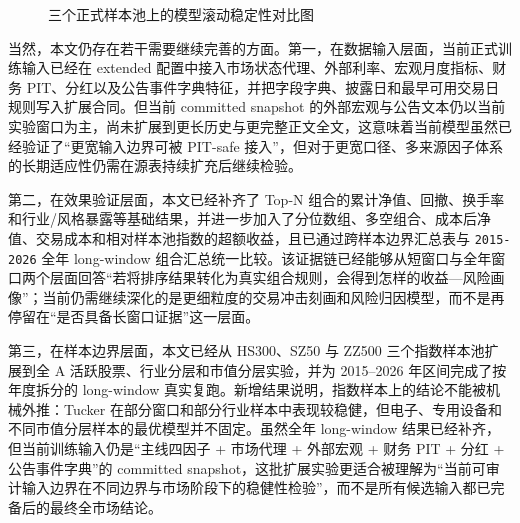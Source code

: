 \begin{figure}[htbp]
\centering
{}
\caption{三个正式样本池上的模型滚动稳定性对比图}
\label{fig:stability}
\end{figure}

当然，本文仍存在若干需要继续完善的方面。第一，在数据输入层面，当前正式训练输入已经在 extended 配置中接入市场状态代理、外部利率、宏观月度指标、财务 PIT、分红以及公告事件字典特征，并把字段字典、披露日和最早可用交易日规则写入扩展合同。但当前 committed snapshot 的外部宏观与公告文本仍以当前实验窗口为主，尚未扩展到更长历史与更完整正文全文，这意味着当前模型虽然已经验证了“更宽输入边界可被 PIT-safe 接入”，但对于更宽口径、多来源因子体系的长期适应性仍需在源表持续扩充后继续检验。

第二，在效果验证层面，本文已经补齐了 Top-N 组合的累计净值、回撤、换手率和行业/风格暴露等基础结果，并进一步加入了分位数组、多空组合、成本后净值、交易成本和相对样本池指数的超额收益，且已通过跨样本边界汇总表与 \texttt{2015-2026} 全年 long-window 组合汇总统一比较。该证据链已经能够从短窗口与全年窗口两个层面回答“若将排序结果转化为真实组合规则，会得到怎样的收益—风险画像”；当前仍需继续深化的是更细粒度的交易冲击刻画和风险归因模型，而不是再停留在“是否具备长窗口证据”这一层面。

第三，在样本边界层面，本文已经从 HS300、SZ50 与 ZZ500 三个指数样本池扩展到全 A 活跃股票、行业分层和市值分层实验，并为 2015--2026 年区间完成了按年度拆分的 long-window 真实复跑。新增结果说明，指数样本上的结论不能被机械外推：Tucker 在部分窗口和部分行业样本中表现较稳健，但电子、专用设备和不同市值分层样本的最优模型并不固定。虽然全年 long-window 结果已经补齐，但当前训练输入仍是“主线四因子 + 市场代理 + 外部宏观 + 财务 PIT + 分红 + 公告事件字典”的 committed snapshot，这批扩展实验更适合被理解为“当前可审计输入边界在不同边界与市场阶段下的稳健性检验”，而不是所有候选输入都已完备后的最终全市场结论。

